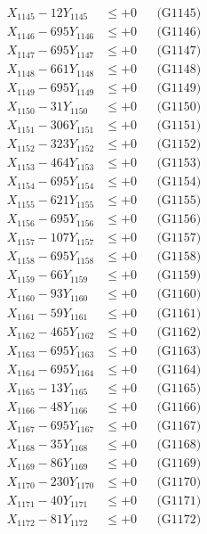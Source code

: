 \documentclass[a4paper,10pt]{article}
\begin{document}
{\begin{align}
X_{1145} - 12Y_{1145} &\leq +0 && \text{(G1145)} \\
X_{1146} - 695Y_{1146} &\leq +0 && \text{(G1146)} \\
X_{1147} - 695Y_{1147} &\leq +0 && \text{(G1147)} \\
X_{1148} - 661Y_{1148} &\leq +0 && \text{(G1148)} \\
X_{1149} - 695Y_{1149} &\leq +0 && \text{(G1149)} \\
X_{1150} - 31Y_{1150} &\leq +0 && \text{(G1150)} \\
\allowbreak
X_{1151} - 306Y_{1151} &\leq +0 && \text{(G1151)} \\
X_{1152} - 323Y_{1152} &\leq +0 && \text{(G1152)} \\
X_{1153} - 464Y_{1153} &\leq +0 && \text{(G1153)} \\
X_{1154} - 695Y_{1154} &\leq +0 && \text{(G1154)} \\
X_{1155} - 621Y_{1155} &\leq +0 && \text{(G1155)} \\
X_{1156} - 695Y_{1156} &\leq +0 && \text{(G1156)} \\
X_{1157} - 107Y_{1157} &\leq +0 && \text{(G1157)} \\
X_{1158} - 695Y_{1158} &\leq +0 && \text{(G1158)} \\
X_{1159} - 66Y_{1159} &\leq +0 && \text{(G1159)} \\
X_{1160} - 93Y_{1160} &\leq +0 && \text{(G1160)} \\
\allowbreak
X_{1161} - 59Y_{1161} &\leq +0 && \text{(G1161)} \\
X_{1162} - 465Y_{1162} &\leq +0 && \text{(G1162)} \\
X_{1163} - 695Y_{1163} &\leq +0 && \text{(G1163)} \\
X_{1164} - 695Y_{1164} &\leq +0 && \text{(G1164)} \\
X_{1165} - 13Y_{1165} &\leq +0 && \text{(G1165)} \\
X_{1166} - 48Y_{1166} &\leq +0 && \text{(G1166)} \\
X_{1167} - 695Y_{1167} &\leq +0 && \text{(G1167)} \\
X_{1168} - 35Y_{1168} &\leq +0 && \text{(G1168)} \\
X_{1169} - 86Y_{1169} &\leq +0 && \text{(G1169)} \\
X_{1170} - 230Y_{1170} &\leq +0 && \text{(G1170)} \\
\allowbreak
X_{1171} - 40Y_{1171} &\leq +0 && \text{(G1171)} \\
X_{1172} - 81Y_{1172} &\leq +0 && \text{(G1172)} \\

\end{align}}
\end{document}
